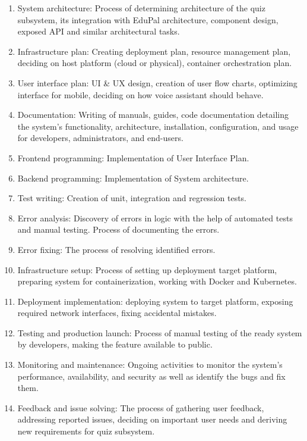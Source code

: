 \documentclass[
    english, %
]{VUMIFPSkursinis}
\begin{document}
\begin{enumerate}[label=\arabic*.]
    \item System architecture: Process of determining architecture of the quiz subsystem, its integration with EduPal architecture, component design, exposed API and similar architectural tasks.
    \item Infrastructure plan: Creating deployment plan, resource management plan, deciding on host platform (cloud or physical), container orchestration plan.
    \item User interface plan: UI \& UX design, creation of user flow charts, optimizing interface for mobile, deciding on how voice assistant should behave.
    \item Documentation: Writing of manuals, guides, code documentation detailing the system's functionality, architecture, installation, configuration, and usage for developers, administrators, and end-users.
    \item Frontend programming: Implementation of User Interface Plan.
    \item Backend programming: Implementation of System architecture.
    \item Test writing: Creation of unit, integration and regression tests.
    \item Error analysis: Discovery of errors in logic with the help of automated tests and manual testing. Process of documenting the errors.
    \item Error fixing: The process of resolving identified errors.
    \item Infrastructure setup: Process of setting up deployment target platform, preparing system for containerization, working with Docker and Kubernetes.
    \item Deployment implementation: deploying system to target platform, exposing required network interfaces, fixing accidental mistakes.
    \item Testing and production launch: Process of manual testing of the ready system by developers, making the feature available to public.
    \item Monitoring and maintenance: Ongoing activities to monitor the system's performance, availability, and security as well as identify the bugs and fix them.
    \item Feedback and issue solving: The process of gathering user feedback, addressing reported issues, deciding on important user needs and deriving new requirements for quiz subsystem.
\end{enumerate}
\end{document}
